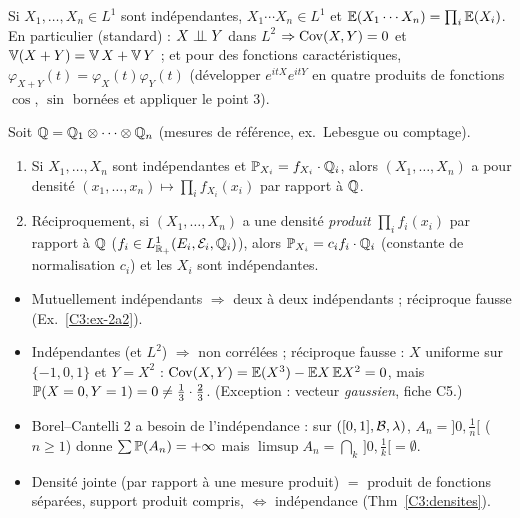 \documentclass[11pt,a4paper]{article}
\begin{document}
\begin{corollaire}\label{C3:EXY}
Si $X_1,\dots,X_n\in L^1$ sont indépendantes, $X_1\cdots X_n\in L^1$ et $\mathbb{E}(X_1\cdots X_n)=\prod_i\mathbb{E}(X_i)$.
En particulier (standard) : $X\perp\!\!\!\perp Y$ dans $L^2$ $\Rightarrow\operatorname{Cov}(X,Y)=0$ et $\operatorname{\mathbb{V}}(X+Y)=\operatorname{\mathbb{V}} X+\operatorname{\mathbb{V}} Y$ ; et pour des
fonctions caractéristiques, $\varphi_{X+Y}(t)=\varphi_X(t)\varphi_Y(t)$ (développer $e^{itX}e^{itY}$ en quatre produits de fonctions $\cos$, $\sin$ bornées et appliquer le point 3).
\end{corollaire}

\begin{theoreme}\label{C3:densites}
Soit $\mathbb{Q}=\mathbb{Q}_1\otimes\dots\otimes\mathbb{Q}_n$ (mesures de référence, ex.\ Lebesgue ou comptage).
\begin{enumerate}
  \item Si $X_1,\dots,X_n$ sont indépendantes et $\mathbb{P}_{X_i}=f_{X_i}\cdot\mathbb{Q}_i$, alors $(X_1,\dots,X_n)$ a pour densité
  $(x_1,\dots,x_n)\mapsto\prod_i f_{X_i}(x_i)$ par rapport à $\mathbb{Q}$.
  \item Réciproquement, si $(X_1,\dots,X_n)$ a une densité \emph{produit} $\prod_i f_i(x_i)$ par rapport à $\mathbb{Q}$
  ($f_i\in L^1_{\mathbb{R}_+}(E_i,\mathcal{E}_i,\mathbb{Q}_i)$), alors $\mathbb{P}_{X_i}=c_if_i\cdot\mathbb{Q}_i$ (constante de normalisation $c_i$) et les
  $X_i$ sont indépendantes.
\end{enumerate}
\end{theoreme}

\begin{liens}
\begin{itemize}
  \item Mutuellement indépendants $\Rightarrow$ deux à deux indépendants ; réciproque fausse (Ex.~\ref{C3:ex-2a2}).
  \item Indépendantes (et $L^2$) $\Rightarrow$ non corrélées ; réciproque fausse : $X$ uniforme sur $\{-1,0,1\}$ et $Y=X^2$ :
  $\operatorname{Cov}(X,Y)=\mathbb{E}(X^3)-\mathbb{E} X\,\mathbb{E} X^2=0$, mais $\mathbb{P}(X=0,Y=1)=0\neq\frac13\cdot\frac23$.
  (Exception : vecteur \emph{gaussien}, fiche C5.)
  \item Borel--Cantelli 2 a besoin de l'indépendance : sur $([0,1],\mathcal{B},\lambda)$, $A_n=]0,\frac1n[$ ($n\ge1$) donne
  $\sum\mathbb{P}(A_n)=+\infty$ mais $\limsup A_n=\bigcap_k\,]0,\frac1k[=\emptyset$.
  \item Densité jointe (par rapport à une mesure produit) $=$ produit de fonctions séparées, support produit compris, $\iff$ indépendance (Thm~\ref{C3:densites}).
\end{itemize}
\end{liens}
\end{document}
